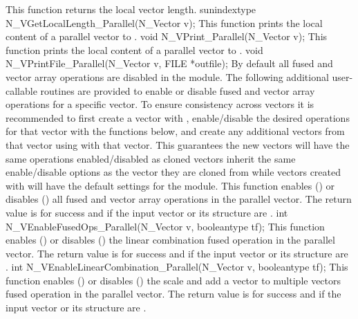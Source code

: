 {
  This function returns the local vector length.
}
{
  sunindextype N\_VGetLocalLength\_Parallel(N\_Vector v);
}
{
  This function prints the local content of a parallel vector to .
}
{
  void N\_VPrint\_Parallel(N\_Vector v);
}
{
  This function prints the local content of a parallel vector to .
}
{
  void N\_VPrintFile\_Parallel(N\_Vector v, FILE *outfile);
}
By default all fused and vector array operations are disabled in the {\nvecp}
module. The following additional user-callable routines are provided to
enable or disable fused and vector array operations for a specific vector. To
ensure consistency across vectors it is recommended to first create a vector
with , enable/disable the desired operations for that vector
with the functions below, and create any additional vectors from that vector
using  with that vector. This guarantees the new vectors will
have the same operations enabled/disabled as cloned vectors inherit the same
enable/disable options as the vector they are cloned from while vectors created with
 will have the default settings for the {\nvecp} module.
{
  This function enables () or disables () all fused and
  vector array operations in the parallel vector. The return value is  for
  success and  if the input vector or its  structure are .
}
{
  int N\_VEnableFusedOps\_Parallel(N\_Vector v, booleantype tf);
}
{
  This function enables () or disables () the linear
  combination fused operation in the parallel vector. The return value is  for
  success and  if the input vector or its  structure are .
}
{
  int N\_VEnableLinearCombination\_Parallel(N\_Vector v, booleantype tf);
}
{
  This function enables () or disables () the scale and
  add a vector to multiple vectors fused operation in the parallel vector. The
  return value is  for success and  if the input vector or its
   structure are .
}
